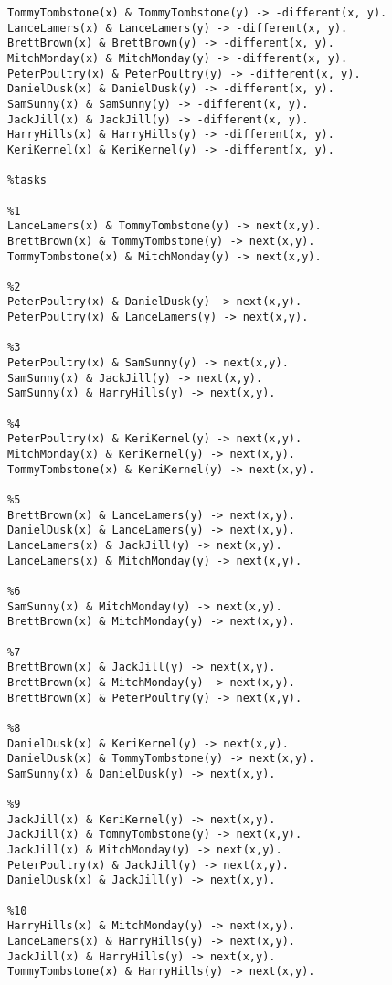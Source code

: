 \documentclass[a4paper,12pt]{report}
\begin{document}
\begin{verbatim}
TommyTombstone(x) & TommyTombstone(y) -> -different(x, y).
LanceLamers(x) & LanceLamers(y) -> -different(x, y).
BrettBrown(x) & BrettBrown(y) -> -different(x, y).
MitchMonday(x) & MitchMonday(y) -> -different(x, y).
PeterPoultry(x) & PeterPoultry(y) -> -different(x, y).
DanielDusk(x) & DanielDusk(y) -> -different(x, y).
SamSunny(x) & SamSunny(y) -> -different(x, y).
JackJill(x) & JackJill(y) -> -different(x, y).
HarryHills(x) & HarryHills(y) -> -different(x, y).
KeriKernel(x) & KeriKernel(y) -> -different(x, y).

%tasks

%1
LanceLamers(x) & TommyTombstone(y) -> next(x,y).
BrettBrown(x) & TommyTombstone(y) -> next(x,y).
TommyTombstone(x) & MitchMonday(y) -> next(x,y).

%2
PeterPoultry(x) & DanielDusk(y) -> next(x,y).
PeterPoultry(x) & LanceLamers(y) -> next(x,y).

%3
PeterPoultry(x) & SamSunny(y) -> next(x,y).
SamSunny(x) & JackJill(y) -> next(x,y).
SamSunny(x) & HarryHills(y) -> next(x,y).

%4
PeterPoultry(x) & KeriKernel(y) -> next(x,y).
MitchMonday(x) & KeriKernel(y) -> next(x,y).
TommyTombstone(x) & KeriKernel(y) -> next(x,y).

%5
BrettBrown(x) & LanceLamers(y) -> next(x,y).
DanielDusk(x) & LanceLamers(y) -> next(x,y).
LanceLamers(x) & JackJill(y) -> next(x,y).
LanceLamers(x) & MitchMonday(y) -> next(x,y).

%6
SamSunny(x) & MitchMonday(y) -> next(x,y).
BrettBrown(x) & MitchMonday(y) -> next(x,y).

%7
BrettBrown(x) & JackJill(y) -> next(x,y).
BrettBrown(x) & MitchMonday(y) -> next(x,y).
BrettBrown(x) & PeterPoultry(y) -> next(x,y).

%8
DanielDusk(x) & KeriKernel(y) -> next(x,y).
DanielDusk(x) & TommyTombstone(y) -> next(x,y).
SamSunny(x) & DanielDusk(y) -> next(x,y).

%9
JackJill(x) & KeriKernel(y) -> next(x,y).
JackJill(x) & TommyTombstone(y) -> next(x,y).
JackJill(x) & MitchMonday(y) -> next(x,y).
PeterPoultry(x) & JackJill(y) -> next(x,y).
DanielDusk(x) & JackJill(y) -> next(x,y).

%10
HarryHills(x) & MitchMonday(y) -> next(x,y).
LanceLamers(x) & HarryHills(y) -> next(x,y).
JackJill(x) & HarryHills(y) -> next(x,y).
TommyTombstone(x) & HarryHills(y) -> next(x,y).
\end{verbatim}
\end{document}
